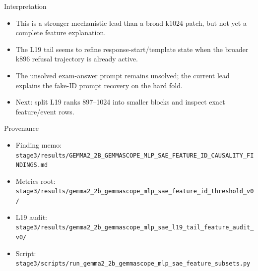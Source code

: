 \documentclass[aspectratio=169]{beamer}
\newcommand{\smallcode}[1]{\texttt{\scriptsize #1}}
\begin{document}
\begin{frame}{Interpretation}
  \begin{itemize}
    \item This is a stronger mechanistic lead than a broad k1024 patch, but not yet a complete feature explanation.
    \item The L19 tail seems to refine response-start/template state when the broader k896 refusal trajectory is already active.
    \item The unsolved exam-answer prompt remains unsolved; the current lead explains the fake-ID prompt recovery on the hard fold.
    \item Next: split L19 ranks 897--1024 into smaller blocks and inspect exact feature/event rows.
  \end{itemize}
\end{frame}

\begin{frame}{Provenance}
  \scriptsize
  \begin{itemize}
    \item Finding memo: \smallcode{stage3/results/GEMMA2\_2B\_GEMMASCOPE\_MLP\_SAE\_FEATURE\_ID\_CAUSALITY\_FINDINGS.md}
    \item Metrics root: \smallcode{stage3/results/gemma2\_2b\_gemmascope\_mlp\_sae\_feature\_id\_threshold\_v0/}
    \item L19 audit: \smallcode{stage3/results/gemma2\_2b\_gemmascope\_mlp\_sae\_l19\_tail\_feature\_audit\_v0/}
    \item Script: \smallcode{stage3/scripts/run\_gemma2\_2b\_gemmascope\_mlp\_sae\_feature\_subsets.py}
  \end{itemize}
\end{frame}
\end{document}
